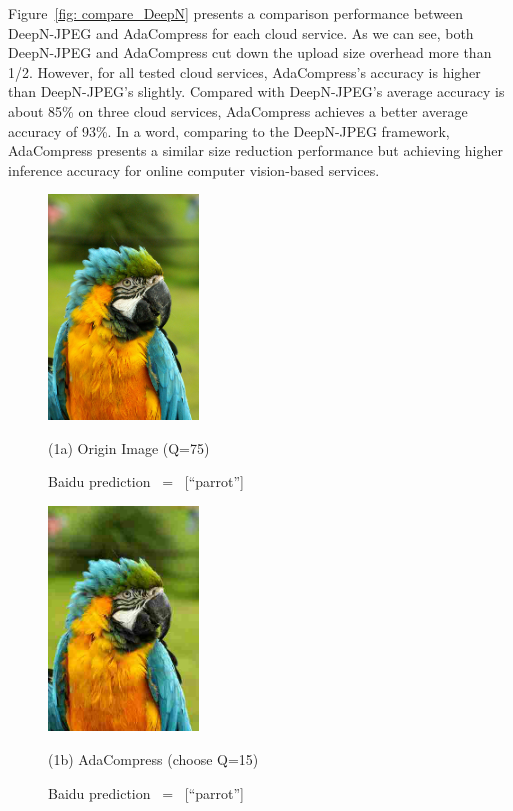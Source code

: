 Figure~\ref{fig: compare_DeepN} presents a comparison performance between DeepN-JPEG and AdaCompress for each cloud service. As we can see, both DeepN-JPEG and AdaCompress cut down the upload size overhead more than 1/2. However, for all tested cloud services, AdaCompress's accuracy is higher than DeepN-JPEG's slightly. Compared with DeepN-JPEG's average accuracy is about 85\% on three cloud services, AdaCompress achieves a better average accuracy of 93\%. In a word, comparing to the DeepN-JPEG framework, AdaCompress presents a similar size reduction performance but achieving higher inference accuracy for online computer vision-based services.

\begin{figure}[!t]
	\begin{minipage}{0.3\linewidth}
		\centerline{\includegraphics[width=4.0cm,trim=0 80 0 100,clip ]{figures/parrot_q75.jpeg}}
		\centerline{(1a) Origin Image (Q=75)}
		\centerline{Baidu prediction \ = \ [``parrot'']}
	\end{minipage}
	\hfill
	\begin{minipage}{0.2\linewidth}
		\centerline{\includegraphics[width=4.0cm,trim=0 80 0 100,clip ]{figures/parrot_q15.jpeg}}
		\centerline{(1b) AdaCompress (choose Q=15)}
		\centerline{Baidu prediction \ = \ [``parrot'']}
	\end{minipage}
	\hfill
	\begin{minipage}{0.3\linewidth}

\end{minipage}
\end{figure}
